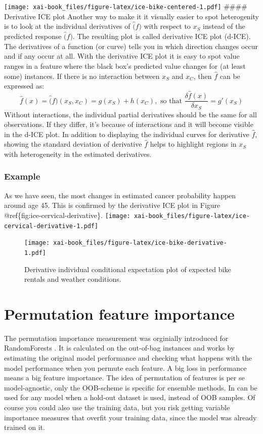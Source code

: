 \documentclass[12pt,]{krantz}
\theoremstyle{definition}
\theoremstyle{definition}
\theoremstyle{definition}
\theoremstyle{remark}
\begin{document}
\texttt{[image: xai-book\_files/figure-latex/ice-bike-centered-1.pdf]}
\#\#\#\# Derivative ICE plot Another way to make it it visually easier
to spot heterogenity is to look at the individual derivatives of
\(\hat(f)\) with respect to \(x_S\) instead of the predicted response
\(\hat(f)\). The resulting plot is called derivative ICE plot (d-ICE).
The derivatives of a function (or curve) tells you in which direction
changes occur and if any occur at all. With the derivative ICE plot it
is easy to spot value ranges in a feature where the black box's
predicted value changes for (at least some) instances. If there is no
interaction between \(x_S\) and \(x_C\), then \(\hat{f}\) can be
expressed as:
\[\hat{f}(x) = \hat(f)(x_S, x_C) = g(x_S) + h(x_C), \text{ so that } \frac{\delta\hat{f}(x)}{\delta x_S} = g'(x_S)\]
Without interactions, the individual partial derivatives should be the
same for all observations. If they differ, it's because of interactions
and it will become visible in the d-ICE plot. In addition to displaying
the individual curves for derivative \(\hat{f}\), showing the standard
deviation of derivative \(\hat{f}\) helps to highlight regions in
\(x_S\) with heterogeneity in the estimated derivatives.

\citep{goldstein2015peeking}

\subsubsection{Example}\label{example-2}

As we have seen, the most changes in estimated cancer probability happen
around age 45. This is confirmed by the derivative ICE plot in Figure
@ref\{fig:ice-cervical-derivative\}.
\texttt{[image: xai-book\_files/figure-latex/ice-cervical-derivative-1.pdf]}

\begin{figure}
\centering
\texttt{[image: xai-book\_files/figure-latex/ice-bike-derivative-1.pdf]}
\caption{\label{fig:ice-bike-derivative}Derivative individual conditional
expectation plot of expected bike rentals and weather conditions.}
\end{figure}

\section{Permutation feature
importance}\label{permutation-feature-importance}

The permutation importance measurement was orginially introduced for
RandomForests \citep{breiman2001random}. It is calculated on the
out-of-bag instances and works by estimating the original model
performance and checking what happens with the model performance when
you permute each feature. A big loss in performance means a big feature
importance. The idea of permutation of features is per se
model-agnostic, only the OOB-scheme is specific for ensemble methods. In
can be used for any model when a hold-out dataset is used, instead of
OOB samples. Of course you could also use the training data, but you
risk getting variable importance measures that overfit your training
data, since the model was already trained on it.
\end{document}
